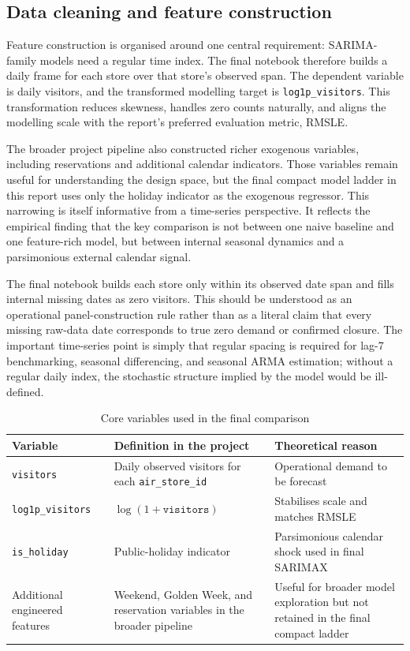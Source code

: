 \documentclass[11pt,oneside]{scrartcl}
\begin{document}
\subsection{Data cleaning and feature construction}
Feature construction is organised around one central requirement: SARIMA-family models need a regular time index. The final notebook therefore builds a daily frame for each store over that store's observed span. The dependent variable is daily visitors, and the transformed modelling target is \texttt{log1p\_visitors}. This transformation reduces skewness, handles zero counts naturally, and aligns the modelling scale with the report's preferred evaluation metric, RMSLE.

The broader project pipeline also constructed richer exogenous variables, including reservations and additional calendar indicators. Those variables remain useful for understanding the design space, but the final compact model ladder in this report uses only the holiday indicator as the exogenous regressor. This narrowing is itself informative from a time-series perspective. It reflects the empirical finding that the key comparison is not between one naive baseline and one feature-rich model, but between internal seasonal dynamics and a parsimonious external calendar signal.

The final notebook builds each store only within its observed date span and fills internal missing dates as zero visitors. This should be understood as an operational panel-construction rule rather than as a literal claim that every missing raw-data date corresponds to true zero demand or confirmed closure. The important time-series point is simply that regular spacing is required for lag-7 benchmarking, seasonal differencing, and seasonal ARMA estimation; without a regular daily index, the stochastic structure implied by the model would be ill-defined.

\begin{table}[H]
\centering
\caption{Core variables used in the final comparison}
\begin{tabularx}{\textwidth}{>{\raggedright\arraybackslash}p{} >{\raggedright\arraybackslash}p{} >{\raggedright\arraybackslash}X}
\toprule
Variable & Definition in the project & Theoretical reason \\
\midrule
\texttt{visitors} & Daily observed visitors for each \texttt{air\_store\_id} & Operational demand to be forecast \\
\texttt{log1p\_visitors} & $\log(1+\texttt{visitors})$ & Stabilises scale and matches RMSLE \\
\texttt{is\_holiday} & Public-holiday indicator & Parsimonious calendar shock used in final SARIMAX \\
Additional engineered features & Weekend, Golden Week, and reservation variables in the broader pipeline & Useful for broader model exploration but not retained in the final compact ladder \\
\bottomrule
\end{tabularx}
\end{table}
\end{document}
